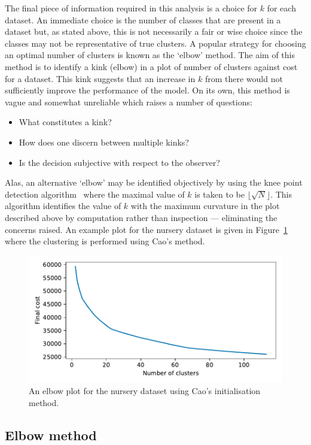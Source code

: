 The final piece of information required in this analysis is a choice for \(k\)
for each dataset. An immediate choice is the number of classes that are present
in a dataset but, as stated above, this is not necessarily a fair or wise choice
since the classes may not be representative of true clusters. A popular strategy
for choosing an optimal number of clusters is known as the `elbow' method. The
aim of this method is to identify a kink (elbow) in a plot of number of clusters
against cost for a dataset. This kink suggests that an increase in \(k\) from
there would not sufficiently improve the performance of the model. On its own,
this method is vague and somewhat unreliable which raises a number of questions:
\begin{itemize}
    \item What constitutes a kink?
    \item How does one discern between multiple kinks?
    \item Is the decision subjective with respect to the observer?
\end{itemize}

Alas, an alternative `elbow' may be identified objectively by using
the knee point detection algorithm~\cite{Satopaa2011} where the maximal
value of \(k\) is taken to be \(\lfloor\sqrt{N}\rfloor\). This algorithm
identifies the value of \(k\) with the maximum curvature in the plot described
above by computation rather than inspection --- eliminating the concerns raised.
An example plot for the nursery dataset is given in
Figure~\ref{fig:nursery_costs} where the clustering is performed using Cao's
method.

\begin{figure}
    \centering
    \includegraphics[width=.6\linewidth]{./img/elbow/nursery_costs.pdf}
    \caption{An elbow plot for the nursery dataset using Cao's initialisation
             method.}\label{fig:nursery_costs}
\end{figure}

\subsection{Elbow method}
\graphicspath{{./img/elbow/}}

